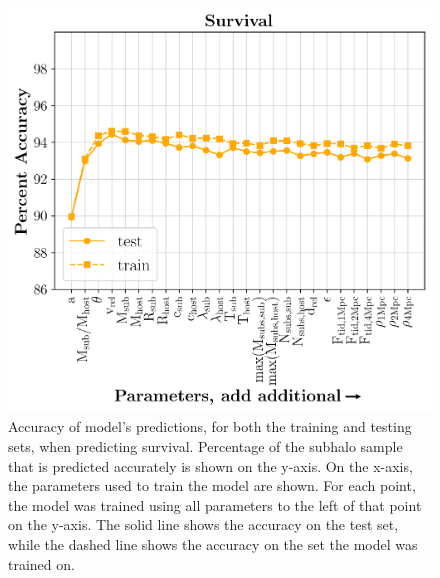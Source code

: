 \documentclass[fleqn,usenatbib]{mnras}
\begin{document}
\begin{figure}
	\includegraphics[width=\columnwidth]{Figures/survival_predictions}
	\vspace{-15pt}
    \caption{Accuracy of model's predictions, for both the training and testing sets, when predicting survival. Percentage of the subhalo sample that is predicted accurately is shown on the y-axis. On the x-axis, the parameters used to train the model are shown. For each point, the model was trained using all parameters to the left of that point on the y-axis. The solid line shows the accuracy on the test set, while the dashed line shows the accuracy on the set the model was trained on.}
    \label{fig:survival_predictions}
\end{figure}
\end{document}
